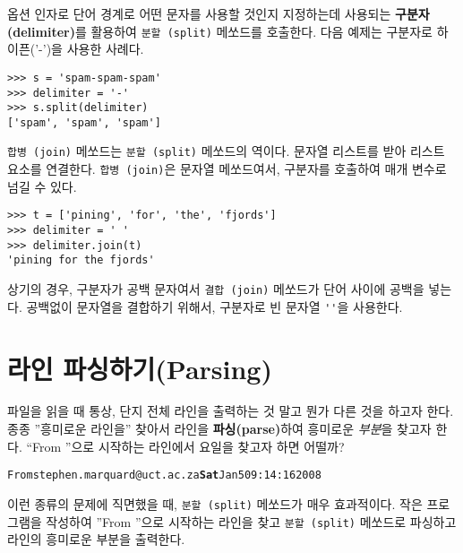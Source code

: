 옵션 인자로 단어 경계로 어떤 문자를 사용할 것인지 지정하는데 사용되는 {\bf 구분자 (delimiter)}를 활용하여 {\tt 분할 (split)} 메쏘드를 호출한다.
다음 예제는 구분자로 하이픈('-')을 사용한 사례다.


\beforeverb
\begin{verbatim}
>>> s = 'spam-spam-spam'
>>> delimiter = '-'
>>> s.split(delimiter)
['spam', 'spam', 'spam']
\end{verbatim}
\afterverb
%

{\tt 합병 (join)} 메쏘드는 {\tt 분할 (split)} 메쏘드의 역이다. 
문자열 리스트를 받아 리스트 요소를 연결한다.
{\tt 합병 (join)}은 문자열 메쏘드여서, 구분자를 호출하여 매개 변수로 넘길 수 있다.


\beforeverb
\begin{verbatim}
>>> t = ['pining', 'for', 'the', 'fjords']
>>> delimiter = ' '
>>> delimiter.join(t)
'pining for the fjords'
\end{verbatim}
\afterverb
%

상기의 경우, 구분자가 공백 문자여서 {\tt 결합 (join)} 메쏘드가 단어 사이에 공백을 넣는다.
공백없이 문자열을 결합하기 위해서, 구분자로 빈 문자열 \verb"''"을 사용한다.


\section{라인 파싱하기(Parsing)}

파일을 읽을 때 통상, 단지 전체 라인을 출력하는 것 말고 뭔가 다른 것을 하고자 한다.
종종 ''흥미로운 라인을'' 찾아서 라인을 {\bf 파싱(parse)}하여 흥미로운 \emph{ 부분}을 찾고자 한다.
``From ''으로 시작하는 라인에서 요일을 찾고자 하면 어떨까?

\beforeverb
\begin{alltt}
From stephen.marquard@uct.ac.za {\bf Sat} Jan  5 09:14:16 2008
\end{alltt}
\afterverb

이런 종류의 문제에 직면했을 때, {\tt 분할 (split)} 메쏘드가 매우 효과적이다.
작은 프로그램을 작성하여 ''From ''으로 시작하는 라인을 찾고 {\tt 분할 (split)} 메쏘드로 파싱하고 라인의 흥미로운 부분을 출력한다. 

